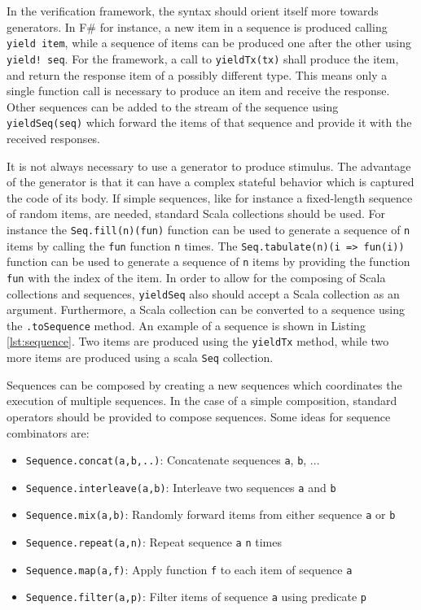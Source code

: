 \documentclass[11pt,a4paper]{report}
\newcommand{\ttt}{\texttt}
\begin{document}
In the verification framework, the syntax should orient itself more towards generators. In F\# for instance, a new
item in a sequence is produced calling \ttt{yield item}, while a sequence of items can be produced one after the
other using \ttt{yield! seq}. For the framework, a call to \ttt{yieldTx(tx)} shall produce the item, and return
the response item of a possibly different type. This means only a single function call is necessary to produce an item and receive the response.
Other sequences can be added to the stream of the sequence using \ttt{yieldSeq(seq)} which forward the items of that sequence and provide it with the received responses.

It is not always necessary to use a generator to produce stimulus. The advantage of the generator is that it can have a complex stateful behavior which is captured the code of its body. If simple sequences, like for instance a fixed-length sequence of random items, are needed, standard Scala collections should be used. For instance the \ttt{Seq.fill(n)(fun)} function can be used to generate a sequence of \ttt{n} items by calling the \ttt{fun} function \ttt{n} times. The \ttt{Seq.tabulate(n)(i => fun(i))} function can be used to generate a sequence of \ttt{n} items by providing the function \ttt{fun} with the index of the item. In order to allow for the composing of Scala collections and sequences, \ttt{yieldSeq} also should accept a Scala collection as an argument. Furthermore, a Scala collection can be converted to a sequence using the \ttt{.toSequence} method. An example of a sequence is shown in Listing \ref{lst:sequence}. Two items are produced using the \ttt{yieldTx} method, while two more items are produced using a scala \ttt{Seq} collection.


Sequences can be composed by creating a new sequences which coordinates the execution of multiple sequences. In the case of a simple composition, standard operators should be provided to compose sequences. Some ideas for sequence combinators are:

\begin{itemize}
  \item \ttt{Sequence.concat(a,b,..)}: Concatenate sequences \ttt{a}, \ttt{b}, ...
  \item \ttt{Sequence.interleave(a,b)}: Interleave two sequences \ttt{a} and \ttt{b}
  \item \ttt{Sequence.mix(a,b)}: Randomly forward items from either sequence \ttt{a} or \ttt{b}
  \item \ttt{Sequence.repeat(a,n)}: Repeat sequence \ttt{a} \ttt{n} times
  \item \ttt{Sequence.map(a,f)}: Apply function \ttt{f} to each item of sequence \ttt{a}
  \item \ttt{Sequence.filter(a,p)}: Filter items of sequence \ttt{a} using predicate \ttt{p}
\end{itemize}
\end{document}
